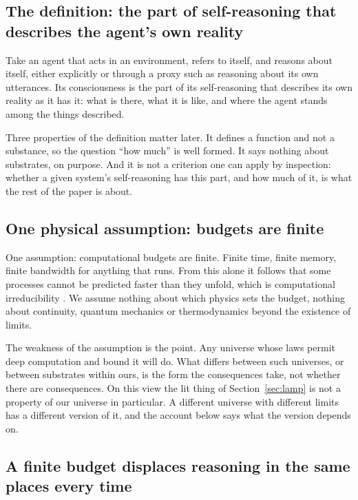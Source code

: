 \subsection{The definition: the part of self-reasoning that describes the agent's own reality}
\label{sec:definition}

Take an agent that acts in an environment, refers to itself, and reasons about itself, either
explicitly or through a proxy such as reasoning about its own utterances. Its consciousness is the part
of its self-reasoning that describes its own reality as it has it: what is there, what it is like, and
where the agent stands among the things described.

Three properties of the definition matter later. It defines a function and not a substance, so the
question ``how much'' is well formed. It says nothing about substrates, on purpose. And it is not a
criterion one can apply by inspection: whether a given system's self-reasoning has this part, and how
much of it, is what the rest of the paper is about.

\subsection{One physical assumption: budgets are finite}
\label{sec:physics}

One assumption: computational budgets are finite. Finite time, finite memory, finite bandwidth for
anything that runs. From this alone it follows that some processes cannot be predicted faster than they
unfold, which is computational irreducibility \citep{wolfram2002}. We assume nothing about which physics
sets the budget, nothing about continuity, quantum mechanics or thermodynamics beyond the existence of
limits.

The weakness of the assumption is the point. Any universe whose laws permit deep computation and bound
it will do. What differs between such universes, or between substrates within ours, is the form the
consequences take, not whether there are consequences. On this view the lit thing of
Section~\ref{sec:lamp} is not a property of our universe in particular. A different universe with
different limits has a different version of it, and the account below says what the version depends on.

\subsection{A finite budget displaces reasoning in the same places every time}
\label{sec:hocp}


